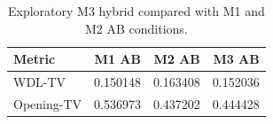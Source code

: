 \begin{table}[t]
\centering
\caption{Exploratory M3 hybrid compared with M1 and M2 AB conditions.}
\label{tab:m3}
\begin{tabular}{lrrr}
\toprule
Metric & M1 AB & M2 AB & M3 AB \\
\midrule
WDL-TV & 0.150148 & 0.163408 & 0.152036 \\
Opening-TV & 0.536973 & 0.437202 & 0.444428 \\
\bottomrule
\end{tabular}
\end{table}
